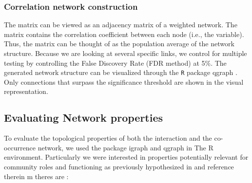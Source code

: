 \documentclass{frontiersSCNS} %
\begin{document}
\subsubsection*{Correlation network construction}


The matrix can be viewed as an adjacency matrix of a weighted network. The matrix contains the correlation coefficient between each node (i.e., the variable). Thus, the matrix can be thought of as the population average of the network structure. Because we are looking at several specific links, we control for multiple testing by controlling the False Discovery Rate (FDR method) at 5\%. The generated network structure can be visualized through the \texttt{R} package qgraph \citep{qgraph}. Only connections that surpass the significance threshold are shown in the visual representation. 

\subsection*{Evaluating Network properties}

To evaluate the topological properties of both the interaction  and the co-occurrence network, we used the package igraph and qgraph in The R environment. Particularly we were interested in properties potentially relevant for community roles and functioning as previously hypothesized in and reference therein m theres are :
\end{document}
